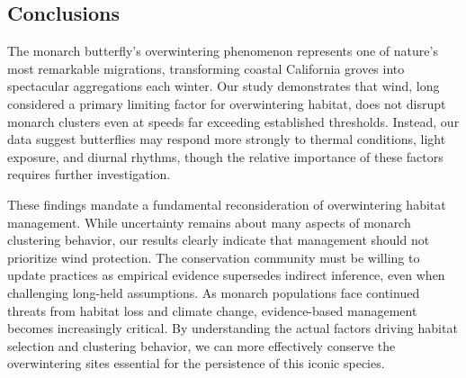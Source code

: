 \subsection{Conclusions}

The monarch butterfly's overwintering phenomenon represents one of nature's most remarkable migrations, transforming coastal California groves into spectacular aggregations each winter. Our study demonstrates that wind, long considered a primary limiting factor for overwintering habitat, does not disrupt monarch clusters even at speeds far exceeding established thresholds. Instead, our data suggest butterflies may respond more strongly to thermal conditions, light exposure, and diurnal rhythms, though the relative importance of these factors requires further investigation.

These findings mandate a fundamental reconsideration of overwintering habitat management. While uncertainty remains about many aspects of monarch clustering behavior, our results clearly indicate that management should not prioritize wind protection. The conservation community must be willing to update practices as empirical evidence supersedes indirect inference, even when challenging long-held assumptions. As monarch populations face continued threats from habitat loss and climate change, evidence-based management becomes increasingly critical. By understanding the actual factors driving habitat selection and clustering behavior, we can more effectively conserve the overwintering sites essential for the persistence of this iconic species.